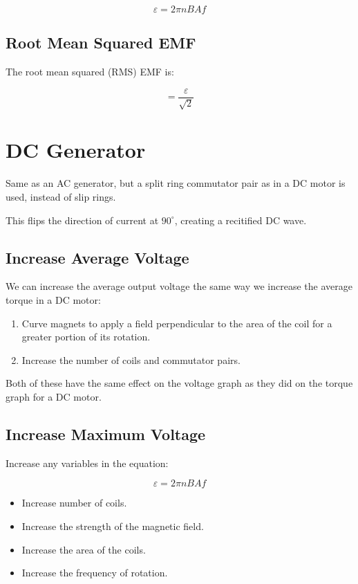 \documentclass[a4paper,11pt]{article}
\begin{document}
$$
\varepsilon = 2\pi n BA f
$$


\subsection{Root Mean Squared EMF}

The root mean squared (RMS) EMF is:

$$
= \frac{\varepsilon}{\sqrt{2}}
$$




\section{DC Generator}

Same as an AC generator, but a split ring commutator pair as in a DC motor is
used, instead of slip rings.

This flips the direction of current at $90^\circ$, creating a recitified DC
wave.


\subsection{Increase Average Voltage}

We can increase the average output voltage the same way we increase the average
torque in a DC motor:

\begin{enumerate}
\item Curve magnets to apply a field perpendicular to the area of the coil for
	a greater portion of its rotation.
\item Increase the number of coils and commutator pairs.
\end{enumerate}

Both of these have the same effect on the voltage graph as they did on the
torque graph for a DC motor.


\subsection{Increase Maximum Voltage}

Increase any variables in the equation:

$$
\varepsilon = 2\pi n BA f
$$

\begin{itemize}
\item Increase number of coils.
\item Increase the strength of the magnetic field.
\item Increase the area of the coils.
\item Increase the frequency of rotation.
\end{itemize}
\end{document}
